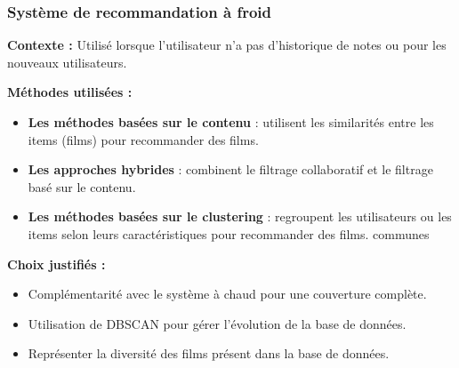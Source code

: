 \documentclass{beamer}
\begin{document}
    \begin{frame}
        \scriptsize
        \frametitle{Système de recommandation à froid}
        \textbf{Contexte :} Utilisé lorsque l’utilisateur n’a pas d’historique de notes ou pour les nouveaux utilisateurs.

        \vspace{0.3cm}
        \textbf{Méthodes utilisées : }
        \begin{itemize}
            \item \textbf{Les méthodes basées sur le contenu} : utilisent les similarités entre les items (films) pour recommander des films.
            \item \textbf{Les approches hybrides} : combinent le filtrage collaboratif et le filtrage basé sur le contenu.
            \item \textbf{Les méthodes basées sur le clustering} : regroupent les utilisateurs ou les items selon leurs caractéristiques pour recommander des films.
    communes
        \end{itemize}

        \vspace{0.3cm}
        \textbf{Choix justifiés :}
        \begin{itemize}
            \item Complémentarité avec le système à chaud pour une couverture complète.
            \item Utilisation de DBSCAN pour gérer l'évolution de la base de données.
            \item Représenter la diversité des films présent dans la base de données.
        \end{itemize}
    \end{frame}
\end{document}
